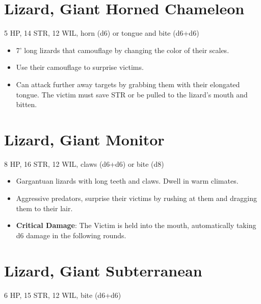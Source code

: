 \documentclass[
  10pt,
  american,
]{article}
\begin{document}
\hypertarget{lizard-giant-horned-chameleon}{%
\section{Lizard, Giant Horned
Chameleon}\label{lizard-giant-horned-chameleon}}

5 HP, 14 STR, 12 WIL, horn (d6) or tongue and bite (d6+d6)

\begin{samepage}
\begin{itemize}
\setlength\itemsep{-.5em}
\item 7' long lizards that camouflage by changing the color of their scales.
\item Use their camouflage to surprise victims.
\item Can attack further away targets by grabbing them with their elongated tongue. The victim must save STR or be pulled to the lizard's mouth and bitten.
\end{itemize}
\end{samepage}

\hypertarget{lizard-giant-monitor}{%
\section{Lizard, Giant Monitor}\label{lizard-giant-monitor}}

8 HP, 16 STR, 12 WIL, claws (d6+d6) or bite (d8)

\begin{samepage}
\begin{itemize}
\setlength\itemsep{-.5em}
\item Gargantuan lizards with long teeth and claws. Dwell in warm climates.
\item Aggressive predators, surprise their victims by rushing at them and dragging them to their lair.
\item \textbf{Critical Damage}: The Victim is held into the mouth, automatically taking d6 damage in the following rounds.
\end{itemize}
\end{samepage}

\hypertarget{lizard-giant-subterranean}{%
\section{Lizard, Giant Subterranean}\label{lizard-giant-subterranean}}

6 HP, 15 STR, 12 WIL, bite (d6+d6)
\end{document}

